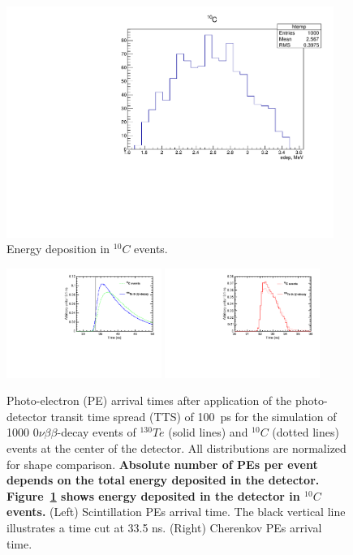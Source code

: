 \documentclass[12pt,twoside,letterpaper]{article}
\newcommand{\vbb}{0\nu\beta\beta}
\newcommand{\Te}{^{130}Te}
\newcommand{\Cten}{^{10}C}
\begin{document}
\begin{figure}[htb]
\centering
\includegraphics[angle=0,width=0.95\textwidth]{plots/hEdep_C10.pdf}
\caption{Energy deposition in $\Cten$ events.}
\label{fig:Edep_C10}
\end{figure}

\begin{figure}[htb]
\centering
\includegraphics[angle=0,width=0.45\textwidth]{plots/hT_C10.pdf}
\includegraphics[angle=0,width=0.45\textwidth]{plots/hTche_C10.pdf}
\caption{Photo-electron (PE) arrival times after application of the photo-detector transit time spread (TTS) of 100~ps for the simulation of 1000 $\vbb$-decay events of $\Te$ (solid lines) and $\Cten$ (dotted lines) events at the center of the detector. All distributions are normalized for shape comparison. {\bf Absolute number of PEs per event depends on the total energy deposited in the detector. Figure~\ref{fig:Edep_C10} shows energy deposited in the detector in $\Cten$ events.} (Left) Scintillation PEs arrival time. The black vertical line illustrates a time cut at 33.5 ns. (Right) Cherenkov PEs arrival time.}
\label{fig:Arrival_time_C10}
\end{figure}
\end{document}
